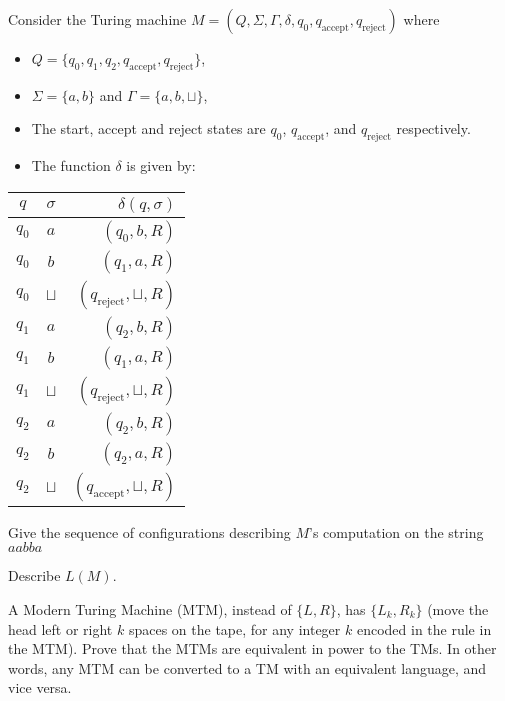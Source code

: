 \documentclass[solution, letterpaper]{cscie121}
\begin{document}



 Consider the Turing machine $M=(Q, \Sigma,
\Gamma,\delta, q_0, q_{\mathrm{accept}}, q_{\mathrm{reject}})$
where\begin{itemize}\item
$Q = \{q_0, q_1, q_2, q_{\mathrm{accept}},q_{\mathrm{reject}}\}$,
\item $\Sigma = \{a,b\}$ and $\Gamma =\{a,b,\sqcup\}$, \item The
start, accept and reject states are $q_0$, $q_{\mathrm{accept}}$,
and $q_{\mathrm{reject}}$ respectively. \item The function
$\delta$ is given
by:\end{itemize}\begin{center}\begin{tabular}{cc|r}$q$ & $\sigma$
& $\delta(q, \sigma)$ \\ \hline\hline$q_0$ & $a$ & $(q_0, b,
R)$\\$q_0$ & $b$ & $(q_1, a, R)$\\$q_0$ & $\sqcup$ &
$(q_{\mathrm{reject}}, \sqcup, R)$\\$q_1$ & $a$ & $(q_2, b,
R)$\\$q_1$ & $b$ & $(q_1, a, R)$\\$q_1$ & $\sqcup$ &
$(q_{\mathrm{reject}}, \sqcup, R)$\\$q_2$ & $a$ & $(q_2, b,
R)$\\$q_2$ & $b$ & $(q_2, a, R)$\\$q_2$ & $\sqcup$ &
$(q_{\mathrm{accept}}, \sqcup,
R)$\\\end{tabular}\end{center}

\subproblem Give the sequence of configurations describing $M$'s computation
on the string $aabba$

\subproblem Describe $L(M)$.


\begin{solution}
\end{solution}

\pagebreak

A Modern Turing Machine (MTM), instead of $\{L,R\}$, has $\{L_k, R_k\}$ (move the head left or right $k$ spaces on the tape, for any integer $k$ encoded in the rule in the MTM). Prove that the MTMs are equivalent in power to the TMs. In other words, any MTM can be converted to a TM with an equivalent language, and vice versa.
\end{document}
